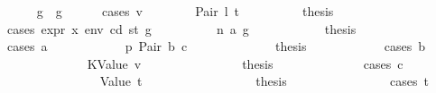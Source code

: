 \begin{isabellebody}
\ \ \ \ \isamarkupfalse%
\ {\isachardoublequoteopen}g{}{\isacharprime}{\kern0pt}\ {\isasymle}\ g{\isachardoublequoteclose}\isanewline
\ \ \ \ \isamarkupfalse%
\ {\isacharparenleft}{\kern0pt}cases\ v{}{\isacharprime}{\kern0pt}{\isacharparenright}{\kern0pt}\isanewline
\ \ \ \ \ \ \isamarkupfalse%
\ {\isacharparenleft}{\kern0pt}Pair\ l{}{\isacharprime}{\kern0pt}\ t{}{\isacharprime}{\kern0pt}{\isacharparenright}{\kern0pt}\isanewline
\ \ \ \ \ \ \isamarkupfalse%
\ \isamarkupfalse%
\ {\isacharquery}{\kern0pt}thesis\isanewline
\ \ \ \ \ \ \isamarkupfalse%
\ {\isacharparenleft}{\kern0pt}cases\ {\isachardoublequoteopen}expr\ x\ env\ cd\ st\ g{\isachardoublequoteclose}{\isacharparenright}{\kern0pt}\isanewline
\ \ \ \ \ \ \ \ \isamarkupfalse%
\ {\isacharparenleft}{\kern0pt}n\ a\ g{\isacharprime}{\kern0pt}{\isacharprime}{\kern0pt}{\isacharparenright}{\kern0pt}\isanewline
\ \ \ \ \ \ \ \ \isamarkupfalse%
\ \isamarkupfalse%
\ {\isacharquery}{\kern0pt}thesis\isanewline
\ \ \ \ \ \ \ \ \isamarkupfalse%
\ {\isacharparenleft}{\kern0pt}cases\ a{\isacharparenright}{\kern0pt}\isanewline
\ \ \ \ \ \ \ \ \ \ \isamarkupfalse%
\ p{}{\isacharcolon}{\kern0pt}\ {\isacharparenleft}{\kern0pt}Pair\ b\ c{\isacharparenright}{\kern0pt}\isanewline
\ \ \ \ \ \ \ \ \ \ \isamarkupfalse%
\ \isamarkupfalse%
\ {\isacharquery}{\kern0pt}thesis\isanewline
\ \ \ \ \ \ \ \ \ \ \isamarkupfalse%
\ {\isacharparenleft}{\kern0pt}cases\ b{\isacharparenright}{\kern0pt}\isanewline
\ \ \ \ \ \ \ \ \ \ \ \ \isamarkupfalse%
\ {\isacharparenleft}{\kern0pt}KValue\ v{\isacharparenright}{\kern0pt}\isanewline
\ \ \ \ \ \ \ \ \ \ \ \ \isamarkupfalse%
\ \isamarkupfalse%
\ {\isacharquery}{\kern0pt}thesis\isanewline
\ \ \ \ \ \ \ \ \ \ \ \ \isamarkupfalse%
\ {\isacharparenleft}{\kern0pt}cases\ c{\isacharparenright}{\kern0pt}\isanewline
\ \ \ \ \ \ \ \ \ \ \ \ \ \ \isamarkupfalse%
\ {\isacharparenleft}{\kern0pt}Value\ t{\isacharprime}{\kern0pt}{\isacharparenright}{\kern0pt}\isanewline
\ \ \ \ \ \ \ \ \ \ \ \ \ \ \isamarkupfalse%
\ \isamarkupfalse%
\ {\isacharquery}{\kern0pt}thesis\isanewline
\ \ \ \ \ \ \ \ \ \ \ \ \ \ \isamarkupfalse%
\ {\isacharparenleft}{\kern0pt}cases\ t{\isacharprime}{\kern0pt}{\isacharparenright}{\kern0pt}\isanewline

\end{isabellebody}
